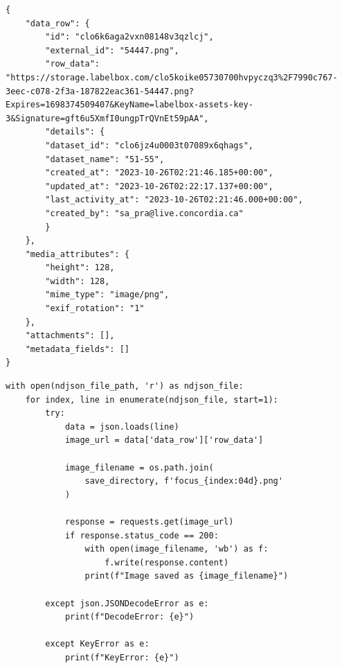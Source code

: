 \begin{lstlisting}[style=json, caption={Sample .ndjson after exporting some filtered images using Labelbox \cite{Labelbox} Slice \cite{LabelboxSlice}}]
{
    "data_row": {
        "id": "clo6k6aga2vxn08148v3qzlcj",
        "external_id": "54447.png",
        "row_data": "https://storage.labelbox.com/clo5koike05730700hvpyczq3%2F7990c767-3eec-c078-2f3a-187822eac361-54447.png?Expires=1698374509407&KeyName=labelbox-assets-key-3&Signature=gft6u5XmfI0ungpTrQVnEt59pAA",
        "details": {
        "dataset_id": "clo6jz4u0003t07089x6qhags",
        "dataset_name": "51-55",
        "created_at": "2023-10-26T02:21:46.185+00:00",
        "updated_at": "2023-10-26T02:22:17.137+00:00",
        "last_activity_at": "2023-10-26T02:21:46.000+00:00",
        "created_by": "sa_pra@live.concordia.ca"
        }
    },
    "media_attributes": {
        "height": 128,
        "width": 128,
        "mime_type": "image/png",
        "exif_rotation": "1"
    },
    "attachments": [],
    "metadata_fields": []
}      
\end{lstlisting}
\vspace*{1em}

\lstset{
  language=Python,
  basicstyle=\ttfamily,
  numbers=left,
  frame=single,
  captionpos=b,
}

\begin{lstlisting}[caption={Consolidating the images}]
with open(ndjson_file_path, 'r') as ndjson_file:
    for index, line in enumerate(ndjson_file, start=1):
        try:
            data = json.loads(line)
            image_url = data['data_row']['row_data']

            image_filename = os.path.join(
                save_directory, f'focus_{index:04d}.png'
            )

            response = requests.get(image_url)
            if response.status_code == 200:
                with open(image_filename, 'wb') as f:
                    f.write(response.content)
                print(f"Image saved as {image_filename}")
        
        except json.JSONDecodeError as e:
            print(f"DecodeError: {e}")
        
        except KeyError as e:
            print(f"KeyError: {e}")
\end{lstlisting}